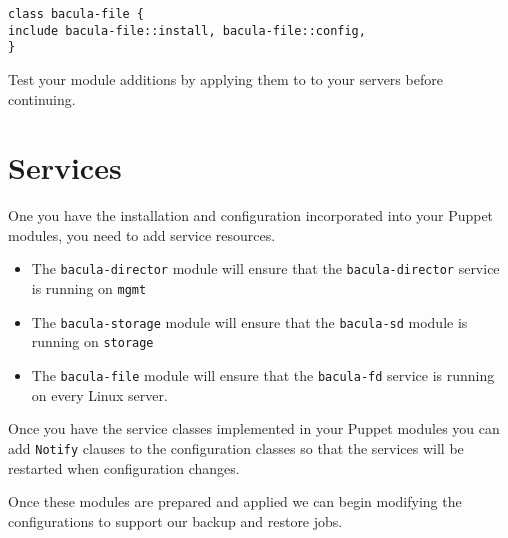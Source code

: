 \documentclass{article}   	%
\begin{document}
\begin{verbatim}
class bacula-file {
include bacula-file::install, bacula-file::config,
}
\end{verbatim}

Test your module additions by applying them to to your servers before continuing.

\section{Services}
One you have the installation and configuration incorporated into your Puppet modules, you need to add service resources.
\begin{itemize}
	\item The \texttt{bacula-director} module will ensure that the \texttt{bacula-director} service is running on \texttt{mgmt}
	\item The \texttt{bacula-storage} module will ensure that the \texttt{bacula-sd} module is running on \texttt{storage}
	\item The \texttt{bacula-file} module will ensure that the \texttt{bacula-fd} service is running on every Linux server.
\end{itemize}

Once you have the service classes implemented in your Puppet modules you can add \texttt{Notify} clauses to the configuration classes so that the services will be restarted when configuration changes.

Once these modules are prepared and applied we can begin modifying the configurations to support our backup and restore jobs.
\end{document}
